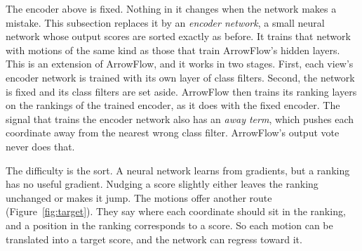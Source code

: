 The encoder above is fixed. Nothing in it changes when the network makes a mistake. This subsection replaces it by an \emph{encoder network}, a small neural network whose output scores are sorted exactly as before. It trains that network with motions of the same kind as those that train ArrowFlow's hidden layers. This is an extension of ArrowFlow, and it works in two stages. First, each view's encoder network is trained with its own layer of class filters. Second, the network is fixed and its class filters are set aside. ArrowFlow then trains its ranking layers on the rankings of the trained encoder, as it does with the fixed encoder. The signal that trains the encoder network also has an \emph{away term}, which pushes each coordinate away from the nearest wrong class filter. ArrowFlow's output vote never does that.

The difficulty is the sort. A neural network learns from gradients, but a ranking has no useful gradient. Nudging a score slightly either leaves the ranking unchanged or makes it jump. The motions offer another route (Figure~\ref{fig:target}). They say where each coordinate should sit in the ranking, and a position in the ranking corresponds to a score. So each motion can be translated into a target score, and the network can regress toward it.

